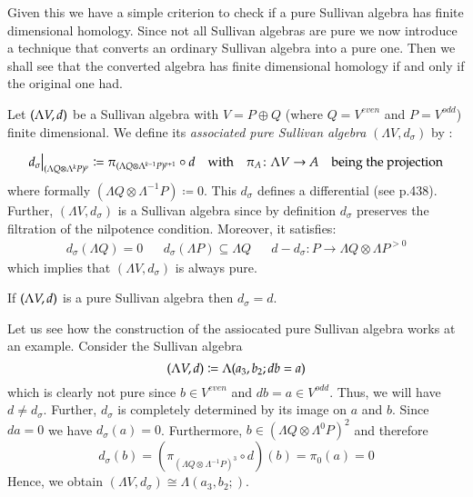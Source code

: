 Given this we have a simple criterion to check if a pure Sullivan algebra has finite dimensional
homology. 
Since not all Sullivan algebras are pure we  now introduce a technique that converts an ordinary Sullivan algebra
into a pure one. Then we shall see that the converted algebra has finite dimensional homology if and only if the original one had.

\begin{Definition}
 Let $(\Lambda V,d)$ be a Sullivan algebra with $V = P \oplus Q$ (where $Q = V^{even}$ and $P = V^{odd}$)
 finite dimensional. We define its 
 \emph{associated pure Sullivan algebra} $(\Lambda V, d_{\sigma})$ by :
  
 \begin{align*}\restr{d_{\sigma}}{(\Lambda Q \otimes \Lambda^k P)^p} \coloneqq \pi_{
 (\Lambda Q \otimes \Lambda^{k-1} P)^{p+1}} \circ d 
 & &\text{with} \quad \pi_A \colon \Lambda V \to A \quad \text{being the projection} \\
 \end{align*}
 where formally $(\Lambda Q \otimes \Lambda^{-1} P) \coloneqq 0$. 
 This $d_{\sigma}$ defines a differential (see  \cite{Felix2001} p.438). Further, $(\Lambda V, d_{\sigma})$ 
 is a Sullivan algebra since by definition $d_{\sigma}$ preserves the filtration of the 
 nilpotence condition. Moreover, it satisfies:
 \begin{align*}
  d_{\sigma}(\Lambda Q) = 0 & & d_{\sigma}(\Lambda P) \subseteq \Lambda Q & & 
  d - d_{\sigma} \colon P \to \Lambda Q \otimes \Lambda P^{> 0}
 \end{align*}
  which implies that $(\Lambda V, d_{\sigma})$ is always pure.
 
 \end{Definition}

 \begin{Remark}
  If $(\Lambda V,d)$ is a pure Sullivan algebra then $d_{\sigma} = d$.
 \end{Remark}

 
 \begin{Example}
  \label{ex:AssociatedNotMinimalSullivanAlgebra}
  Let us see how the construction of the assiocated pure Sullivan algebra works at an example. 
  Consider the Sullivan algebra $$(\Lambda V,d) \coloneqq \Lambda( a_3, b_2 ; db = a)$$ which is clearly not pure since
  $b \in V^{even}$ and $db = a \in V^{odd}$. Thus, we will have $d \neq d_{\sigma}$.
  Further, $d_{\sigma}$ is completely determined by
  its image on $a$ and $b$. Since $da = 0$ we have $d_{\sigma} (a) = 0$. Furthermore,
  $b \in (\Lambda Q \otimes \Lambda^0 P)^2$ and therefore 
  $$d_{\sigma} (b) = (\pi_{ (\Lambda Q \otimes \Lambda^{-1} P)^{3}} \circ d) (b) = \pi_0 (a) = 0$$
  Hence, we obtain $(\Lambda V, d_{\sigma}) \cong \Lambda(a_3, b_2;)$.
  \end{Example}

